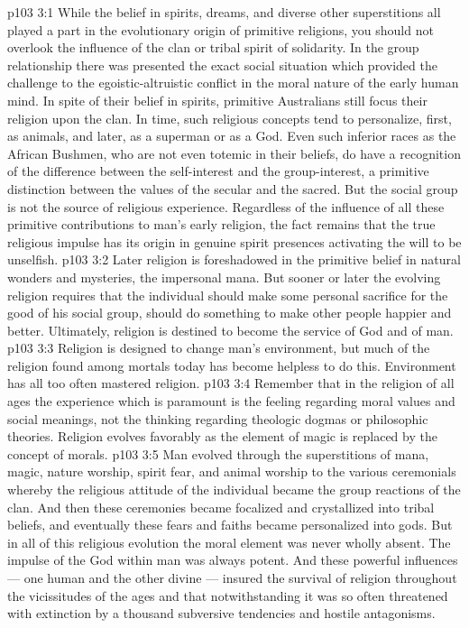 \vs p103 3:1 While the belief in spirits, dreams, and diverse other superstitions all played a part in the evolutionary origin of primitive religions, you should not overlook the influence of the clan or tribal spirit of solidarity. In the group relationship there was presented the exact social situation which provided the challenge to the egoistic\hyp{}altruistic conflict in the moral nature of the early human mind. In spite of their belief in spirits, primitive Australians still focus their religion upon the clan. In time, such religious concepts tend to personalize, first, as animals, and later, as a superman or as a God. Even such inferior races as the African Bushmen, who are not even totemic in their beliefs, do have a recognition of the difference between the self\hyp{}interest and the group\hyp{}interest, a primitive distinction between the values of the secular and the sacred. But the social group is not the source of religious experience. Regardless of the influence of all these primitive contributions to man’s early religion, the fact remains that the true religious impulse has its origin in genuine spirit presences activating the will to be unselfish.
\vs p103 3:2 \pc Later religion is foreshadowed in the primitive belief in natural wonders and mysteries, the impersonal mana. But sooner or later the evolving religion requires that the individual should make some personal sacrifice for the good of his social group, should do something to make other people happier and better. Ultimately, religion is destined to become the service of God and of man.
\vs p103 3:3 Religion is designed to change man’s environment, but much of the religion found among mortals today has become helpless to do this. Environment has all too often mastered religion.
\vs p103 3:4 \pc Remember that in the religion of all ages the experience which is paramount is the feeling regarding moral values and social meanings, not the thinking regarding theologic dogmas or philosophic theories. Religion evolves favorably as the element of magic is replaced by the concept of morals.
\vs p103 3:5 Man evolved through the superstitions of mana, magic, nature worship, spirit fear, and animal worship to the various ceremonials whereby the religious attitude of the individual became the group reactions of the clan. And then these ceremonies became focalized and crystallized into tribal beliefs, and eventually these fears and faiths became personalized into gods. But in all of this religious evolution the moral element was never wholly absent. The impulse of the God within man was always potent. And these powerful influences --- one human and the other divine --- insured the survival of religion throughout the vicissitudes of the ages and that notwithstanding it was so often threatened with extinction by a thousand subversive tendencies and hostile antagonisms.
